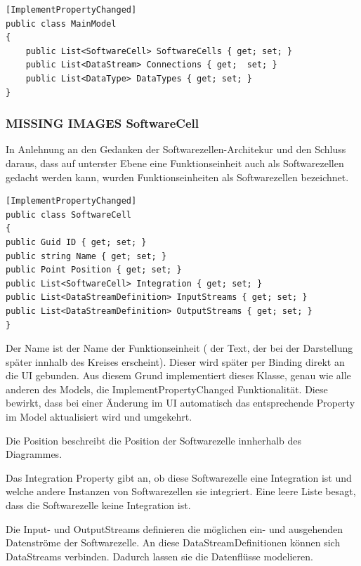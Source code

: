 \begin{verbatim}
[ImplementPropertyChanged]
public class MainModel
{
	public List<SoftwareCell> SoftwareCells { get; set; }
	public List<DataStream> Connections { get;  set; }
	public List<DataType> DataTypes { get; set; } 
}
\end{verbatim}

\subsubsection{{\bfseries\sffamily MISSING IMAGES} SoftwareCell}
\label{sec:orgheadline8}
In Anlehnung an den Gedanken der Softwarezellen-Architekur und den Schluss
daraus, dass auf unterster Ebene eine Funktionseinheit auch als
Softwarezellen gedacht werden kann, wurden Funktionseinheiten als
Softwarezellen bezeichnet.

\begin{verbatim}
[ImplementPropertyChanged]
public class SoftwareCell
{
public Guid ID { get; set; }
public string Name { get; set; }
public Point Position { get; set; }
public List<SoftwareCell> Integration { get; set; }
public List<DataStreamDefinition> InputStreams { get; set; }
public List<DataStreamDefinition> OutputStreams { get; set; }
}
\end{verbatim}

Der Name ist der Name der Funktionseinheit ( der Text, der bei der
Darstellung später innhalb des Kreises erscheint). Dieser wird später per Binding
direkt an die UI gebunden. Aus diesem Grund implementiert dieses Klasse,
genau wie alle anderen des Models, die ImplementPropertyChanged
Funktionalität. Diese bewirkt, dass bei einer Änderung im UI automatisch das
entsprechende Property im Model aktualisiert wird und umgekehrt.

Die Position beschreibt die Position der Softwarezelle innherhalb des
Diagrammes.  

Das Integration Property gibt an, ob diese Softwarezelle eine Integration
ist und welche andere Instanzen von Softwarezellen sie integriert.
Eine leere Liste besagt, dass die Softwarezelle keine Integration ist.

Die Input- und OutputStreams definieren die möglichen ein- und ausgehenden
Datenströme der Softwarezelle. An diese DataStreamDefinitionen können sich DataStreams
verbinden. Dadurch lassen sie die Datenflüsse modelieren.

